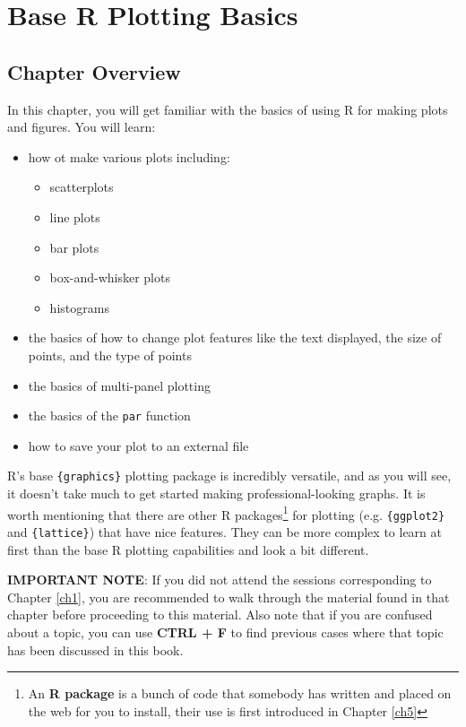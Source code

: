 \documentclass[]{book}
\providecommand{\tightlist}{%
  \setlength{\itemsep}{0pt}\setlength{\parskip}{0pt}}
\let\rmarkdownfootnote\footnote%
\def\footnote{\protect\rmarkdownfootnote}
\theoremstyle{definition}
\theoremstyle{definition}
\theoremstyle{definition}
\theoremstyle{remark}
\begin{document}
\chapter{Base R Plotting Basics}\label{ch2}

\section*{Chapter Overview}\label{chapter-overview-1}

In this chapter, you will get familiar with the basics of using R for
making plots and figures. You will learn:

\begin{itemize}
\tightlist
\item
  how ot make various plots including:

  \begin{itemize}
  \tightlist
  \item
    scatterplots
  \item
    line plots
  \item
    bar plots
  \item
    box-and-whisker plots
  \item
    histograms
  \end{itemize}
\item
  the basics of how to change plot features like the text displayed, the
  size of points, and the type of points
\item
  the basics of multi-panel plotting
\item
  the basics of the \texttt{par} function
\item
  how to save your plot to an external file
\end{itemize}

R's base \texttt{\{graphics\}} plotting package is incredibly versatile,
and as you will see, it doesn't take much to get started making
professional-looking graphs. It is worth mentioning that there are other
R packages\footnote{An \textbf{R package} is a bunch of code that
  somebody has written and placed on the web for you to install, their
  use is first introduced in Chapter \ref{ch5}} for plotting (e.g.
\texttt{\{ggplot2\}} and \texttt{\{lattice\}}) that have nice features.
They can be more complex to learn at first than the base R plotting
capabilities and look a bit different.

\textbf{IMPORTANT NOTE}: If you did not attend the sessions
corresponding to Chapter \ref{ch1}, you are recommended to walk through
the material found in that chapter before proceeding to this material.
Also note that if you are confused about a topic, you can use
\textbf{CTRL + F} to find previous cases where that topic has been
discussed in this book.
\end{document}

